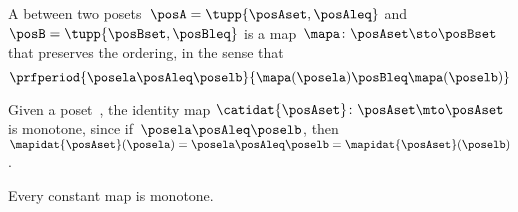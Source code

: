 \begin{definition}
    \label{def:monotone}
    A \emph{} between two posets~$\posA=\tupp{\posAset, \posAleq}$ and~$\posB=\tupp{\posBset, \posBleq}$ is a map~$\mapa \colon \posAset \sto \posBset$ that preserves the ordering, in the sense that
    \begin{equation}\label{eq:monotone-map-definition}
        \prfperiod{
            \posela \posAleq \poselb
        }{
            \mapa(\posela) \posBleq \mapa(\poselb)
        }
    \end{equation}
\end{definition}
\showslides{
    \begin{forslides}
        \begin{equation}\label{eq:monotone-map-identity}
            \prfperiod{
                \posela \posAleq \poselb
            }{
                \posela \posAleq \poselb
            }
        \end{equation}
        \begin{equation}\label{eq:monotone-map-discrete-1}
            \prfdoubleperiod{
                \posela \posAleq \poselb
            }{
                \posela = \poselb
            }
        \end{equation}
        \begin{equation}\label{eq:monotone-map-discrete-2}
            \prfperiod{
                \posela \posAleq \posela
            }{
                \mora(\posela) \posAleq \mora(\posela)
            }
        \end{equation}
        \begin{equation}\label{eq:monotone-map-constant}
            \prfperiod{
                \posela \posAleq \posela
            }{
                \poselc \posAleq \poselc
            }
        \end{equation}
    \end{forslides}
}

\begin{example}
    Given a poset~\posA, the identity map $\catidat{\posAset}\colon \posAset \mto\linebreak[0] \posAset$ is monotone, since if~$\posela\posAleq \poselb$, then~$\mapidat{\posAset}(\posela)=\posela \posAleq  \poselb =  \mapidat{\posAset}(\poselb )$.
\end{example}

\begin{example}
    Every constant map is monotone.
\end{example}

